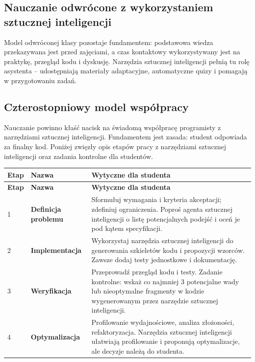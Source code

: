 \documentclass[12pt,a4paper]{article}
\newcommand{\thdrule}{\noalign{\global\setlength{\extrarowheight}{0pt}}}
\newcommand{\thdend}{\noalign{\global\setlength{\extrarowheight}{4pt}}}
\begin{document}
\subsection*{Nauczanie odwrócone z wykorzystaniem sztucznej inteligencji}

\noindent Model odwróconej klasy pozostaje fundamentem: podstawowa wiedza przekazywana jest przed zajęciami, a czas kontaktowy wykorzystywany jest na praktykę, przegląd kodu i dyskusję. Narzędzia sztucznej inteligencji pełnią tu rolę asystenta -- udostępniają materiały adaptacyjne, automatyczne quizy i pomagają w przygotowaniu zadań.
\medskip
\subsection*{Czterostopniowy model współpracy}

\noindent Nauczanie powinno kłaść nacisk na świadomą współpracę programisty z narzędziami sztucznej inteligencji. Fundamentem jest zasada: student odpowiada za finalny kod. Poniżej zwięzły opis etapów pracy z narzędziami sztucznej inteligencji oraz zadania kontrolne dla studentów.
\medskip
{\scriptsize
\begin{longtable}{m{0.8cm}m{3.5cm}m{10cm}}
\thdrule\toprule
\rowcolor{pjatkRed}
{\color{white}\footnotesize\textbf{\vphantom{Ag}Etap}} & {\color{white}\footnotesize\textbf{\vphantom{Ag}Nazwa}} & {\color{white}\footnotesize\textbf{\vphantom{Ag}Wytyczne dla studenta}} \\
\midrule\thdend
\endfirsthead
\thdrule\toprule
\rowcolor{pjatkRed}
{\color{white}\footnotesize\textbf{\vphantom{Ag}Etap}} & {\color{white}\footnotesize\textbf{\vphantom{Ag}Nazwa}} & {\color{white}\footnotesize\textbf{\vphantom{Ag}Wytyczne dla studenta}} \\
\midrule\thdend
\endhead
\rowcolor{tableRowLight} 1 & \textbf{Definicja problemu} & Sformułuj wymagania i kryteria akceptacji; zdefiniuj ograniczenia. Poproś agenta sztucznej inteligencji o listę potencjalnych podejść i oceń je pod kątem specyfikacji. \\
\rowcolor{tableRowAlt} 2 & \textbf{Implementacja} & Wykorzystaj narzędzia sztucznej inteligencji do generowania szkieletów kodu i propozycji wzorców. Zawsze dodaj testy jednostkowe i dokumentację. \\
\rowcolor{tableRowLight} 3 & \textbf{Weryfikacja} & Przeprowadź przegląd kodu i testy. Zadanie kontrolne: wskaż co najmniej 3 potencjalne wady lub nieoptymalne fragmenty w kodzie wygenerowanym przez narzędzie sztucznej inteligencji. \\
\rowcolor{tableRowAlt} 4 & \textbf{Optymalizacja} & Profilowanie wydajnościowe, analiza złożoności, refaktoryzacja. Narzędzia sztucznej inteligencji ułatwiają profilowanie i proponują optymalizacje, ale decyzje należą do studenta. \\
\bottomrule
\end{longtable}}
\medskip
\end{document}
